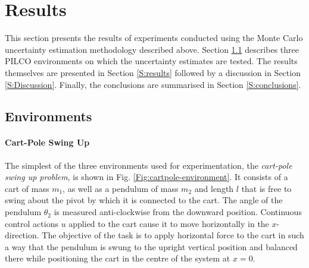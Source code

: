 \chapter{Results}

\ifpdf
    \graphicspath{{Chapter3/Figs/Raster/}{Chapter3/Figs/PDF/}{Chapter3/Figs/}}
\else
    \graphicspath{{Chapter3/Figs/Vector/}{Chapter3/Figures/}}
\fi
This section presents the results of experiments conducted using the Monte Carlo uncertainty estimation methodology described above. Section \ref{S:PILCO-environments} describes three PILCO environments on which the uncertainty estimates are tested. The results themselves are presented in Section \ref{S:results} followed by a discussion in Section \ref{S:Discussion}. Finally, the conclusions are summarised in Section \ref{S:conclusions}. 
\section{Environments}
\label{S:PILCO-environments}


\subsubsection{Cart-Pole Swing Up}
The simplest of the three environments used for experimentation, the \textit{cart-pole swing up problem}, is shown in Fig. \ref{Fig:cartpole-environment}. It consists of a cart of mass $m_1$, as well as a pendulum of mass $m_2$ and length $l$ that is free to swing about the pivot by which it is connected to the cart. The angle of the pendulum $\theta_2$ is measured anti-clockwise from the downward position. Continuous control actions $u$ applied to the cart cause it to move horizontally in the $x$-direction. The objective of the task is to apply horizontal force to the cart in such a way that the pendulum is swung to the upright vertical position and balanced there while positioning the cart in the centre of the system at $x=0$.

